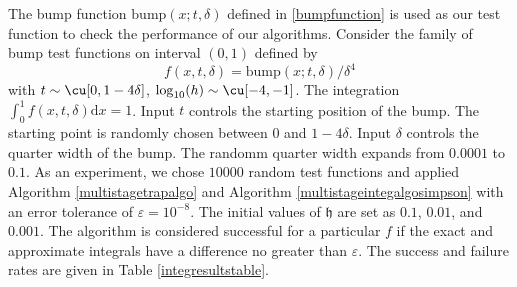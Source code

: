 \documentclass{iitthesis}
\DeclareMathOperator{\Var}{Var}
\theoremstyle{definition}
\theoremstyle{remark}
\begin{document}
The bump function $\text{bump}(x;t,\delta)$ defined in \eqref{bumpfunction} is used as our test function to check the performance of our algorithms. Consider the family of bump test functions on interval $(0,1)$ defined by
\begin{equation}\label{testfun}
f(x,t,\delta)= \text{bump}(x;t,\delta)/\delta^{4}
\end{equation}
with  $t \sim \cu[0,1-4\delta]$, $\log_{10}(h) \sim \cu[-4,-1]$. The integration $\int_{0}^{1}f(x,t,\delta)\text{d}x=1$. Input $t$ controls the starting position of the bump. The starting point is randomly chosen between $0$ and $1-4\delta$. Input $\delta$ controls the quarter width of the bump. The randomm quarter width expands from $0.0001$ to $0.1$.
As an experiment, we chose $10000$ random test functions and applied Algorithm \ref{multistagetrapalgo} and Algorithm \ref{multistageintegalgosimpson} with an error tolerance of  $\varepsilon = 10^{-8}$. The initial values of $\mathfrak{h}$ are set as $0.1$, $0.01$, and $0.001$. The algorithm is considered successful for a particular $f$ if the exact and approximate integrals have a difference no greater than $\varepsilon$. The success and failure rates are given in Table \ref{integresultstable}. %
\end{document}
